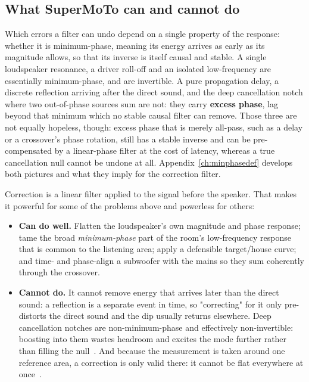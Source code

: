 \subsection{What SuperMoTo can and cannot do}\label{sec:cando}
Which errors a filter can undo depend on a single property of the response: whether it is minimum-phase, meaning its energy arrives as early as its magnitude allows, so that its inverse is itself causal and stable. A single loudspeaker resonance, a driver roll-off and an isolated low-frequency  are essentially minimum-phase, and are invertible. A pure propagation
delay, a discrete reflection arriving after the direct sound, and the deep cancellation notch where two out-of-phase sources sum are not: they carry \textbf{excess phase}, lag beyond that minimum which no stable causal filter can remove. Those three are not equally hopeless, though: excess phase that is merely all-pass, such as a delay or a crossover's phase rotation, still has a
stable inverse and can be pre-compensated by a linear-phase filter at the cost of latency, whereas a true cancellation null cannot be undone at all. Appendix~\ref{ch:minphasedef} develops both pictures and what they imply for the correction filter.

Correction is a linear filter applied to the signal before the speaker. That makes it powerful for some of the problems above and powerless for others:

\begin{itemize}[nosep]
  \item \textbf{Can do well.} Flatten the loudspeaker's own magnitude and phase response; tame the broad \emph{minimum-phase} part of the room's low-frequency response that is common to the listening area; apply a defensible target/house curve; and time- and
        phase-align a subwoofer with the mains so they sum coherently through the crossover.
  \item \textbf{Cannot do.} It cannot remove energy that arrives later than the direct sound: a reflection is a separate event in time, so "correcting" for it only pre-distorts the direct sound and the dip usually returns elsewhere. Deep cancellation notches are non-minimum-phase and effectively non-invertible: boosting into them wastes headroom and excites the mode further rather than filling the null~\cite{NeelyAllen,Mourjopoulos1994}. And because the measurement is taken around one reference area, a correction is only valid there: it cannot be flat everywhere at once~\cite{Toole}.
\end{itemize}

